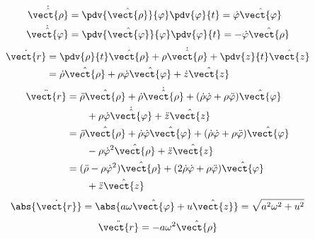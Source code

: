 \begin{align*}
\dot{\hat{\vect{\rho}}}&=\pdv{\hat{\vect{\rho}}}{\varphi}\pdv{\varphi}{t}=\dot{\varphi}\hat{\vect{\varphi}}\\
\dot{\hat{\vect{\varphi}}}&=\pdv{\hat{\vect{\varphi}}}{\varphi}\pdv{\varphi}{t}=-\dot{\varphi}\hat{\vect{\rho}}
\end{align*}
\begin{align*}
\dot{\vect{r}}&=\pdv{\rho}{t}\hat{\vect{\rho}}+\rho\dot{\hat{\vect{\rho}}}+\pdv{z}{t}\hat{\vect{z}}\\
&=\dot{\rho}\hat{\vect{\rho}}+\rho\dot{\varphi}\hat{\vect{\varphi}}+\dot{z}\hat{\vect{z}}
\end{align*}
\begin{align*}
\ddot{\vect{r}}&=\ddot{\rho}\hat{\vect{\rho}}+\dot{\rho}\dot{\hat{\vect{\rho}}}+(\dot{\rho}\dot{\varphi}+\rho\ddot{\varphi})\hat{\vect{\varphi}}\\
&\qquad+\rho\dot{\varphi}\dot{\hat{\vect{\varphi}}}+\ddot{z}\hat{\vect{z}}\\
&=\ddot{\rho}\hat{\vect{\rho}}+\dot{\rho}\dot{\varphi}\hat{\vect{\varphi}}+(\dot{\rho}\dot{\varphi}+\rho\ddot{\varphi})\hat{\vect{\varphi}}\\
&\qquad-\rho\dot{\varphi}^{2}\hat{\vect{\rho}}+\ddot{z}\hat{\vect{z}}\\
&=(\ddot{\rho}-\rho\dot{\varphi}^{2})\hat{\vect{\rho}}+(2\dot{\rho}\dot{\varphi}+\rho\ddot{\varphi})\hat{\vect{\varphi}}\\
&\qquad+\ddot{z}\hat{\vect{z}}
\end{align*}
\[ \abs{\dot{\vect{r}}}=\abs{a\omega\hat{\vect{\varphi}}+u\hat{\vect{z}}}=\sqrt{a^{2}\omega^{2}+u^{2}} \]
\[ \ddot{\vect{r}}=-a\omega^{2}\hat{\vect{\rho}} \]
